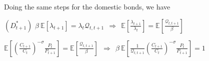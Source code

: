 \documentclass[
]{article}
\begin{document}
Doing the same steps for the domestic bonds, we have

\((D_{t+1}^*)\)
\(\beta \ \mathbb{E}[\lambda_{t+1} ] = \lambda_t\mathcal{Q}_{t,t+1}\ \ \Rightarrow \ \ \displaystyle \mathbb{E}\left[ \frac{\lambda_{t+1}}{\lambda_t}\right] = \mathbb{E}\left[ \frac{\mathcal{Q}_{t,t+1}}{\beta }\right]\)

\(\displaystyle \mathbb{E}\left[ \left( \frac{C_{t+1}}{C_t} \right)^{-\sigma}\frac{P_t}{P_{t+1}}\right] = \mathbb{E}\left[ \frac{\mathcal{Q}_{t,t+1}}{\beta }\right] \ \ \Rightarrow \ \ \beta \  \displaystyle \mathbb{E}\left[ \frac{1}{\mathcal{Q}_{t,t+1}} \left( \frac{C_{t+1}}{C_t} \right)^{-\sigma}\frac{P_t}{P_{t+1}} \right]=1\)
\end{document}
